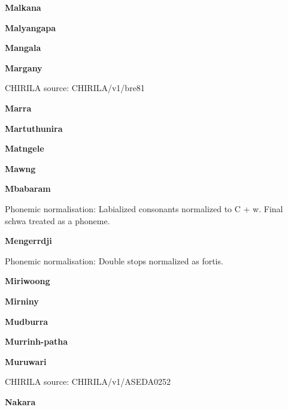 \newpage


\textbf{Malkana}


\textbf{Malyangapa}


\textbf{Mangala}


\textbf{Margany}

CHIRILA source: CHIRILA/v1/bre81


\textbf{Marra}


\textbf{Martuthunira}


\textbf{Matngele}


\textbf{Mawng}


\newpage


\textbf{Mbabaram}


Phonemic normalisation: Labialized consonants normalized to C + w. Final
schwa treated as a phoneme.

\textbf{Mengerrdji}


Phonemic normalisation: Double stops normalized as fortis.

\textbf{Miriwoong}


\textbf{Mirniny}


\textbf{Mudburra}


\textbf{Murrinh-patha}


\textbf{Muruwari}

CHIRILA source: CHIRILA/v1/ASEDA0252


\newpage


\textbf{Nakara}


